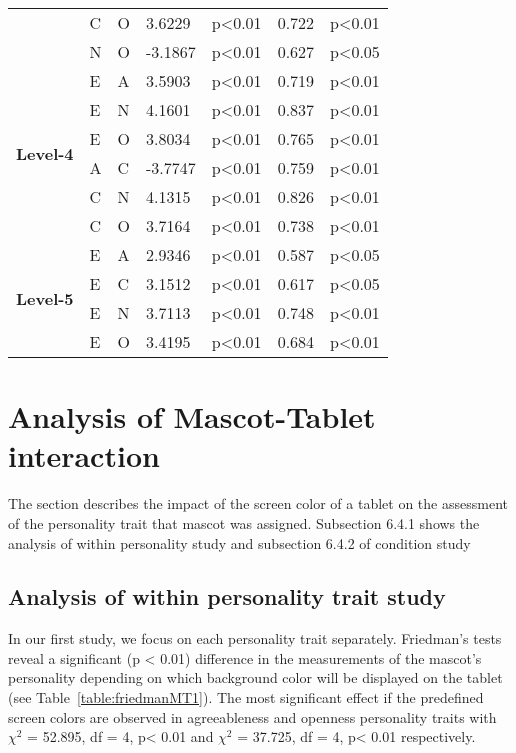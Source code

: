 \begin{longtable}{ |p{1.3cm}| p{0.5cm}|p{0.5cm}|p{1.2cm}| p{1.7cm}|p{1cm}|p{1.5cm}|  }
&C		&O			&3.6229			&p<0.01			& 0.722		&p<0.01\\
&N		&O			&-3.1867			&p<0.01			&0.627 		&p<0.05\\
\hline 
\hline 
\multirow{6}{*}{\textbf{Level-4}} 
&E		&A			&3.5903			&p<0.01			&0.719 		&p<0.01\\
&E		&N			&4.1601			&p<0.01			&0.837 		&p<0.01\\
&E		&O			&3.8034			&p<0.01			&0.765		&p<0.01\\
&A		&C			&-3.7747			&p<0.01			&0.759 		&p<0.01\\
&C		&N			&4.1315			&p<0.01			&0.826 		&p<0.01\\
&C		&O			&3.7164			&p<0.01			&0.738 		&p<0.01\\
\hline 
\hline 
\multirow{4}{*}{\textbf{Level-5}} 
&E		&A			&2.9346			&p<0.01			&0.587 		&p<0.05\\
&E		&C			&3.1512			&p<0.01			&0.617 		&p<0.05\\
&E		&N			&3.7113			&p<0.01			&0.748 		&p<0.01\\
&E		&O			&3.4195			&p<0.01			&0.684 		&p<0.01\\
\hline 
\end{longtable}

\section{Analysis of Mascot-Tablet interaction}
\label{M-T}
The section describes the impact of the screen color of a tablet on the assessment of the personality trait that mascot was assigned. Subsection 6.4.1 shows the analysis of within personality study and subsection 6.4.2 of condition study

\subsection{Analysis of within personality trait study}
\label{Study1(M-T)}
In our first study, we focus on each personality trait separately. Friedman’s tests reveal a significant (p < 0.01) difference in the measurements of the mascot’s personality depending on which background color will be displayed on the tablet (see Table~\ref{table:friedmanMT1}). The most significant effect if the predefined screen colors are observed in agreeableness and openness personality traits with $\chi^2$ = 52.895, df = 4, p< 0.01 and $\chi^2$ = 37.725, df = 4, p< 0.01 respectively.

